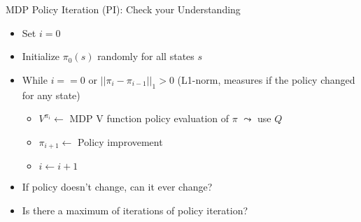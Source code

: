 \begin{frame}[c]{MDP Policy Iteration (PI): Check your Understanding}

\begin{itemize}
	\item Set $i=0$
	\item Initialize $\pi_0(s)$ randomly for all states $s$
	\item While $i == 0$ or $||\pi_i - \pi_{i-1}||_1 > 0$ (L1-norm, measures if the policy changed for any state)
	\begin{itemize}
		\item $V^{\pi_i} \gets$ MDP V function policy \alert{evaluation} of $\pi$ \hspace{1em} $\leadsto$ use $Q$
		\item $\pi_{i+1} \gets$ Policy \alert{improvement}
		\item $i \gets i+1$
	\end{itemize}
	\item \alert{If policy doesn't change, can it ever change?}
	\item \alert{Is there a maximum of iterations of policy iteration?}
\end{itemize}

\end{frame}



